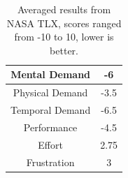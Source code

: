 \begin{table}[hbtp]
    \centering
    \begin{tabular}{ |c|c| }
         \hline
         Mental Demand & -6 \\
         \hline
         Physical Demand & -3.5 \\
         \hline
         Temporal Demand & -6.5 \\
         \hline
         Performance & -4.5 \\
         \hline
         Effort & 2.75 \\
         \hline
         Frustration & 3 \\
        \hline
    \end{tabular}
    \caption{Averaged results from NASA TLX, scores ranged from -10 to 10, lower is better.}
    \label{table:muifold_tlx}
\end{table}